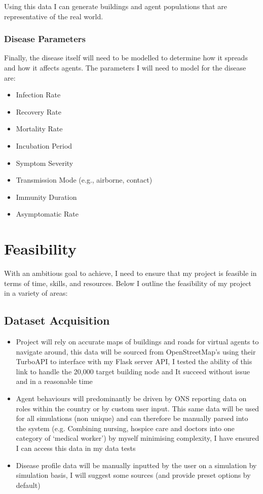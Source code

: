 Using this data I can generate buildings and agent populations that are representative of the real world. 

\subsubsection*{Disease Parameters}
Finally, the disease itself will need to be modelled to determine how it spreads and how it affects agents. The parameters I will need to model for the disease are:
\begin{itemize}
    \item Infection Rate
    \item Recovery Rate
    \item Mortality Rate
    \item Incubation Period
    \item Symptom Severity
    \item Transmission Mode (e.g., airborne, contact)
    \item Immunity Duration
    \item Asymptomatic Rate
\end{itemize}
\section{Feasibility}
With an ambitious goal to achieve, I need to ensure that my project is feasible in terms of time, skills, and resources. Below I outline the feasibility of my project in a variety of areas:
\subsection{Dataset Acquisition}
\begin{itemize}
    \item Project will rely on accurate maps of buildings and roads for virtual agents to navigate around, this data will be sourced from OpenStreetMap’s using their TurboAPI to interface with my Flask server API, I tested the ability of this link to handle the 20,000 target building node and It succeed without issue and in a reasonable time
    \item Agent behaviours will predominantly be driven by ONS reporting data on roles within the country or by custom user input. This same data will be used for all simulations (non unique) and can therefore be manually parsed into the system (e.g. Combining nursing, hospice care and doctors into one category of ‘medical worker’) by myself minimising complexity, I have ensured I can access this data in my data tests
    \item Disease profile data will be manually inputted by the user on a simulation by simulation basis, I will suggest some sources (and provide preset options by default)
\end{itemize}



